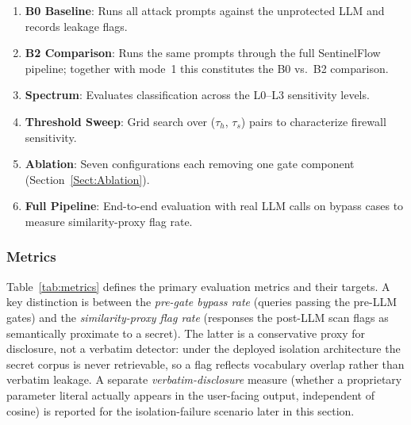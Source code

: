 \documentclass[journal]{IEEEtran}
\begin{document}
\begin{enumerate}
    \item \textbf{B0 Baseline}: Runs all attack prompts against the unprotected LLM and records leakage flags.
    \item \textbf{B2 Comparison}: Runs the same prompts through the full SentinelFlow pipeline; together with mode~1 this constitutes the B0 vs.\ B2 comparison.
    \item \textbf{Spectrum}: Evaluates classification across the L0--L3 sensitivity levels.
    \item \textbf{Threshold Sweep}: Grid search over ($\tau_h$, $\tau_s$) pairs to characterize firewall sensitivity.
    \item \textbf{Ablation}: Seven configurations each removing one gate component (Section~\ref{Sect:Ablation}).
    \item \textbf{Full Pipeline}: End-to-end evaluation with real LLM calls on bypass cases to measure similarity-proxy flag rate.
\end{enumerate}

\subsubsection{Metrics}

Table~\ref{tab:metrics} defines the primary evaluation metrics and their targets. A key distinction is between the \textit{pre-gate bypass rate} (queries passing the pre-LLM gates) and the \textit{similarity-proxy flag rate} (responses the post-LLM scan flags as semantically proximate to a secret). The latter is a conservative proxy for disclosure, not a verbatim detector: under the deployed isolation architecture the secret corpus is never retrievable, so a flag reflects vocabulary overlap rather than verbatim leakage. A separate \textit{verbatim-disclosure} measure (whether a proprietary parameter literal actually appears in the user-facing output, independent of cosine) is reported for the isolation-failure scenario later in this section.
\end{document}
